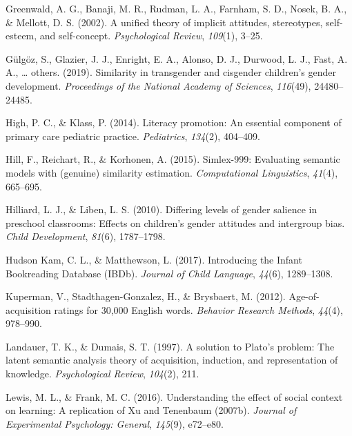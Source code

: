 \documentclass[
  english,
  ,man,floatsintext]{apa6}
\begin{document}
\leavevmode\hypertarget{ref-greenwald2002unified}{}%
Greenwald, A. G., Banaji, M. R., Rudman, L. A., Farnham, S. D., Nosek, B. A., \& Mellott, D. S. (2002). A unified theory of implicit attitudes, stereotypes, self-esteem, and self-concept. \emph{Psychological Review}, \emph{109}(1), 3--25.

\leavevmode\hypertarget{ref-gulgoz2019similarity}{}%
Gülgöz, S., Glazier, J. J., Enright, E. A., Alonso, D. J., Durwood, L. J., Fast, A. A., \ldots{} others. (2019). Similarity in transgender and cisgender children's gender development. \emph{Proceedings of the National Academy of Sciences}, \emph{116}(49), 24480--24485.

\leavevmode\hypertarget{ref-high2014literacy}{}%
High, P. C., \& Klass, P. (2014). Literacy promotion: An essential component of primary care pediatric practice. \emph{Pediatrics}, \emph{134}(2), 404--409.

\leavevmode\hypertarget{ref-hill2015simlex}{}%
Hill, F., Reichart, R., \& Korhonen, A. (2015). Simlex-999: Evaluating semantic models with (genuine) similarity estimation. \emph{Computational Linguistics}, \emph{41}(4), 665--695.

\leavevmode\hypertarget{ref-hilliard2010differing}{}%
Hilliard, L. J., \& Liben, L. S. (2010). Differing levels of gender salience in preschool classrooms: Effects on children's gender attitudes and intergroup bias. \emph{Child Development}, \emph{81}(6), 1787--1798.

\leavevmode\hypertarget{ref-kam_2017}{}%
Hudson Kam, C. L., \& Matthewson, L. (2017). Introducing the Infant Bookreading Database (IBDb). \emph{Journal of Child Language}, \emph{44}(6), 1289--1308.

\leavevmode\hypertarget{ref-kuperman2012age}{}%
Kuperman, V., Stadthagen-Gonzalez, H., \& Brysbaert, M. (2012). Age-of-acquisition ratings for 30,000 English words. \emph{Behavior Research Methods}, \emph{44}(4), 978--990.

\leavevmode\hypertarget{ref-landauer1997solution}{}%
Landauer, T. K., \& Dumais, S. T. (1997). A solution to Plato's problem: The latent semantic analysis theory of acquisition, induction, and representation of knowledge. \emph{Psychological Review}, \emph{104}(2), 211.

\leavevmode\hypertarget{ref-lewis2016understanding}{}%
Lewis, M. L., \& Frank, M. C. (2016). Understanding the effect of social context on learning: A replication of Xu and Tenenbaum (2007b). \emph{Journal of Experimental Psychology: General}, \emph{145}(9), e72--e80.
\end{document}
